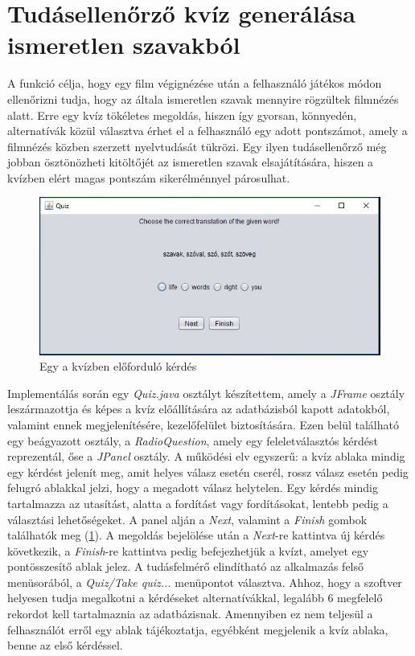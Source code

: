 \section{Tudásellenőrző kvíz generálása ismeretlen szavakból}

A funkció célja, hogy egy film végignézése után a felhasználó játékos módon ellenőrizni tudja, hogy az általa ismeretlen szavak mennyire rögzültek filmnézés alatt.
Erre egy kvíz tökéletes megoldás, hiszen így gyorsan, könnyedén, alternatívák közül választva érhet el a felhasználó egy adott pontszámot, amely a filmnézés közben szerzett nyelvtudását tükrözi. Egy ilyen tudásellenőrző még jobban ösztönözheti kitöltőjét az ismeretlen szavak elsajátítására, hiszen a kvízben elért magas pontszám sikerélménnyel párosulhat.

\begin{figure}[h!]
  \includegraphics[width=\linewidth]{images/quiz.jpg}
  \caption{Egy a kvízben előforduló kérdés}
  \label{fig:quiz}
\end{figure}

Implementálás során egy \textit{Quiz.java} osztályt készítettem, amely a \textit{JFrame} osztály leszármazottja és képes a kvíz előállítására az adatbázisból kapott adatokból, valamint ennek megjelenítésére, kezelőfelület biztosítására. Ezen belül található egy beágyazott osztály, a \textit{RadioQuestion}, amely egy feleletválasztós kérdést reprezentál, őse a \textit{JPanel} osztály. A működési elv egyszerű: a kvíz ablaka mindig egy kérdést jelenít meg, amit helyes válasz esetén cserél, rossz válasz esetén pedig felugró ablakkal jelzi, hogy a megadott válasz helytelen. Egy kérdés mindig tartalmazza az utasítást, alatta a fordítást vagy fordításokat, lentebb pedig a választási lehetőségeket. A panel alján a \textit{Next}, valamint a \textit{Finish} gombok találhatók meg (\ref{fig:quiz}). A megoldás bejelölése után a \textit{Next}-re kattintva új kérdés következik, a \textit{Finish}-re kattintva pedig befejezhetjük a kvízt, amelyet egy pontösszesítő ablak jelez. A tudásfelmérő elindítható az alkalmazás felső menüsorából, a \textit{Quiz/Take quiz...} menüpontot választva. Ahhoz, hogy a szoftver helyesen tudja megalkotni a kérdéseket alternatívákkal, legalább 6 megfelelő rekordot kell tartalmaznia az adatbázisnak. Amennyiben ez nem teljesül a felhasználót erről egy ablak tájékoztatja, egyébként megjelenik a kvíz ablaka, benne az első kérdéssel.

